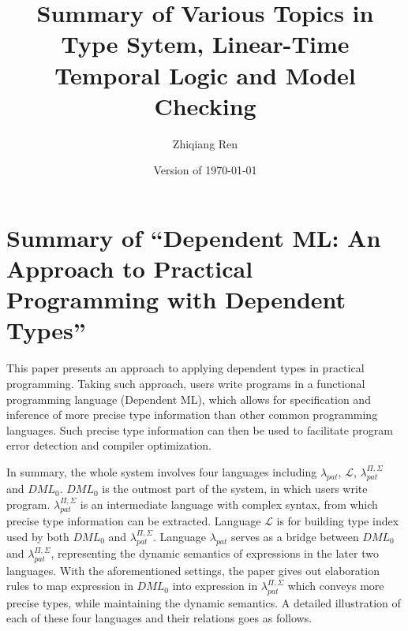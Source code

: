 \documentclass{llncs}
\date{}
\date{Version of \today}
\newcommand{\dmllampat}{$\lambda_{pat}$}
\newcommand{\dmlL}{$\mathcal{L}$}
\newcommand{\dmllamall}{$\lambda_{pat}^{\Pi,\Sigma}$}
\newcommand{\dmlzero}{$DML_0$}
\begin{document}
\title{%
Summary of Various Topics in \break
Type Sytem, Linear-Time Temporal Logic and Model Checking
} %
\author{Zhiqiang Ren}

\maketitle %

% 
% 


\setcounter{page}{1}

\tableofcontents 

\baselineskip=11.875pt

\newpage 
\section{Summary of ``Dependent ML: An Approach to Practical
Programming with Dependent Types''\cite{Xi2007Dependent}}
  \label{section:DML}

This paper presents an approach to applying dependent types in practical
programming. Taking such approach, users write programs in a functional
programming language (Dependent ML), which allows for specification and
inference of more precise type information than other common programming
languages. Such precise type information can then be used to facilitate
program error detection and compiler optimization.

In summary, the whole system involves four languages including \dmllampat, \dmlL,
\dmllamall{} and \dmlzero. \dmlzero{} is the outmost part of the system, in which users
write program. \dmllamall{} is an intermediate language with complex syntax,
from which precise type information can be extracted. Language \dmlL{} is for
building type index used by both \dmlzero{} and \dmllamall. Language
\dmllampat{} serves as a bridge between \dmlzero{} and \dmllamall, representing the dynamic
semantics of expressions in the later two languages. With the aforementioned
settings, the paper gives out elaboration rules to map expression in
\dmlzero{} into expression in \dmllamall{} which conveys more precise types, while
maintaining the dynamic semantics. A detailed illustration of each of these
four languages and their relations goes as follows.
\end{document}
